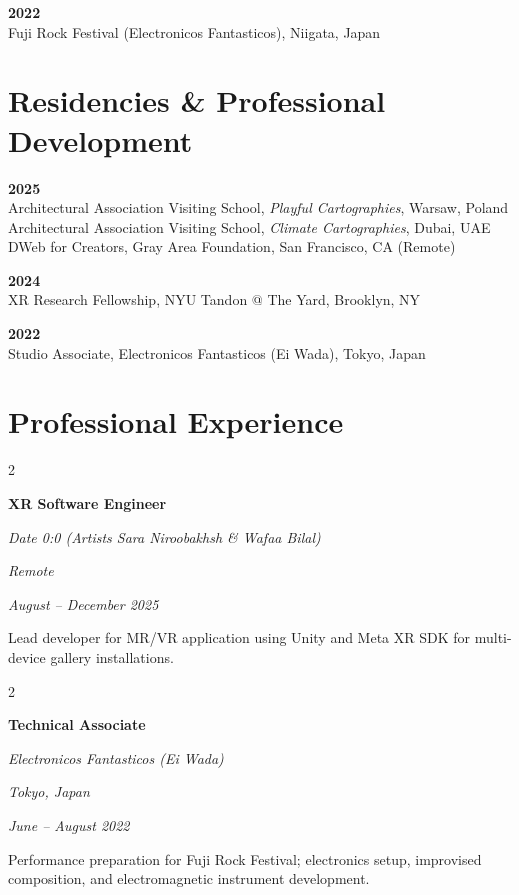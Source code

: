 \documentclass[11pt,a4paper]{article}
\newenvironment{onecolentry}{
    \vspace{0.1em}
}{
    \vspace{0.1em}
}
\newenvironment{twocolentry}[2][]{
    \needspace{4\baselineskip}%
    \onecolentry
    \def\secondColumn{#2}
    \setcolumnwidth{\fill, 5.0 cm}
    \begin{paracol}{2}
}{
    \switchcolumn \raggedleft \secondColumn
    \end{paracol}
    \endonecolentry
}
\begin{document}
\textbf{2022}\\
Fuji Rock Festival (Electronicos Fantasticos), Niigata, Japan

\section*{Residencies \& Professional Development}

\textbf{2025}\\
Architectural Association Visiting School, \textit{Playful Cartographies}, Warsaw, Poland\\
Architectural Association Visiting School, \textit{Climate Cartographies}, Dubai, UAE\\
DWeb for Creators, Gray Area Foundation, San Francisco, CA (Remote)

\textbf{2024}\\
XR Research Fellowship, NYU Tandon @ The Yard, Brooklyn, NY

\textbf{2022}\\
Studio Associate, Electronicos Fantasticos (Ei Wada), Tokyo, Japan

\section*{Professional Experience}

\begin{twocolentry}{
    \textit{Remote}

    \textit{August -- December 2025}
}
    \textbf{XR Software Engineer}

    \textit{Date 0:0 (Artists Sara Niroobakhsh \& Wafaa Bilal)}
\end{twocolentry}
\vspace{0.10 cm}
\begin{onecolentry}
    Lead developer for MR/VR application using Unity and Meta XR SDK for multi-device gallery installations.
\end{onecolentry}

\begin{twocolentry}{
    \textit{Tokyo, Japan}

    \textit{June -- August 2022}
}
    \textbf{Technical Associate}

    \textit{Electronicos Fantasticos (Ei Wada)}
\end{twocolentry}
\vspace{0.10 cm}
\begin{onecolentry}
    Performance preparation for Fuji Rock Festival; electronics setup, improvised composition, and electromagnetic instrument development.
\end{onecolentry}
\vspace{0.2 cm}
\end{document}
